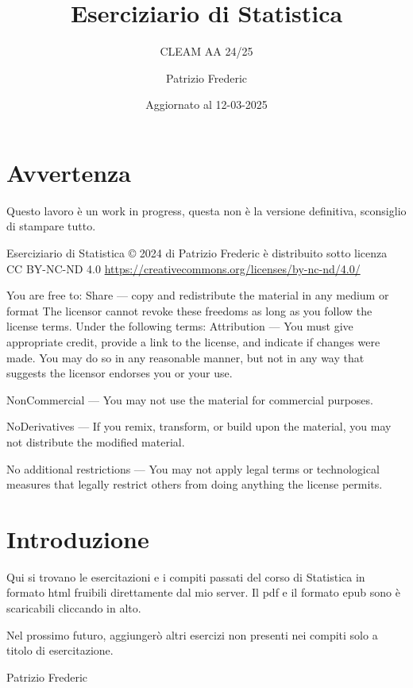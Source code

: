 \documentclass[
  11pt,
]{book}
\title{Eserciziario di Statistica}
\subtitle{CLEAM AA 24/25}
\author{Patrizio Frederic}
\date{Aggiornato al 12-03-2025}
\theoremstyle{mytheoremstyle}
\theoremstyle{mydefstyle}
\begin{document}
\maketitle

{
\setcounter{tocdepth}{1}
\tableofcontents
}
\chapter*{Avvertenza}\label{avvertenza}

\large

Questo lavoro è un work in progress, questa non è la versione definitiva, sconsiglio di stampare tutto.

\normalsize

Eserciziario di Statistica © 2024 di Patrizio Frederic è distribuito
sotto licenza CC BY-NC-ND 4.0
\url{https://creativecommons.org/licenses/by-nc-nd/4.0/}

You are free to:
Share --- copy and redistribute the material in any medium or format
The licensor cannot revoke these freedoms as long as you follow the license terms.
Under the following terms:
Attribution --- You must give appropriate credit, provide a link to the license, and indicate if changes were made. You may do so in any reasonable manner, but not in any way that suggests the licensor endorses you or your use.

NonCommercial --- You may not use the material for commercial purposes.

NoDerivatives --- If you remix, transform, or build upon the material, you may not distribute the modified material.

No additional restrictions --- You may not apply legal terms or technological measures that legally restrict others from doing anything the license permits.

\chapter*{Introduzione}\label{introduzione}

Qui si trovano le esercitazioni e i compiti passati del corso di Statistica
in formato html fruibili direttamente dal mio server.
Il pdf e il formato epub sono è scaricabili cliccando in alto.

Nel prossimo futuro, aggiungerò altri esercizi non presenti nei compiti solo a titolo
di esercitazione.

Patrizio Frederic
\end{document}
